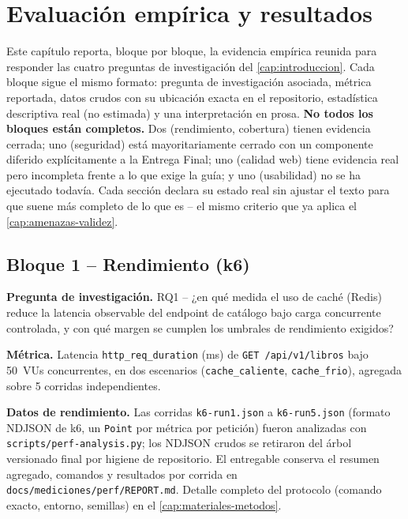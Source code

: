 \chapter{Evaluación empírica y resultados}
\label{cap:resultados}

Este capítulo reporta, bloque por bloque, la evidencia empírica reunida
para responder las cuatro preguntas de investigación del
\autoref{cap:introduccion}. Cada bloque sigue el mismo formato: pregunta
de investigación asociada, métrica reportada, datos crudos con su
ubicación exacta en el repositorio, estadística descriptiva real (no
estimada) y una interpretación en prosa. \textbf{No todos los bloques
están completos.} Dos (rendimiento, cobertura) tienen evidencia cerrada;
uno (seguridad) está mayoritariamente cerrado con un componente diferido
explícitamente a la Entrega Final; uno (calidad web) tiene evidencia real
pero incompleta frente a lo que exige la guía; y uno (usabilidad) no se
ha ejecutado todavía. Cada sección declara su estado real sin ajustar el
texto para que suene más completo de lo que es -- el mismo criterio que
ya aplica el \autoref{cap:amenazas-validez}.

\section{Bloque 1 -- Rendimiento (k6)}
\label{sec:res-rendimiento}

\textbf{Pregunta de investigación.} RQ1 -- ¿en qué medida el uso de caché
(Redis) reduce la latencia observable del endpoint de catálogo bajo carga
concurrente controlada, y con qué margen se cumplen los umbrales de
rendimiento exigidos?

\textbf{Métrica.} Latencia \texttt{http\_req\_duration} (ms) de
\texttt{GET /api/v1/libros} bajo 50~VUs concurrentes, en dos escenarios
(\texttt{cache\_caliente}, \texttt{cache\_frio}), agregada sobre 5
corridas independientes.

\textbf{Datos de rendimiento.}
Las corridas \texttt{k6-run1.json} a \texttt{k6-run5.json}
(formato NDJSON de k6, un \texttt{Point} por métrica por petición)
fueron analizadas con \texttt{scripts/perf-analysis.py}; los NDJSON crudos
se retiraron del árbol versionado final por higiene de repositorio. El
entregable conserva el resumen agregado, comandos y resultados por corrida
en \texttt{docs/mediciones/perf/REPORT.md}. Detalle completo del
protocolo (comando exacto, entorno, semillas) en el
\autoref{cap:materiales-metodos}.

